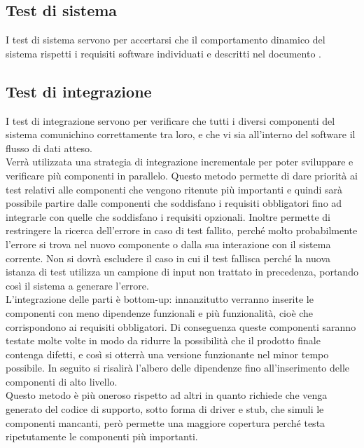 	\subsection{Test di sistema}
	\label{sec:5.4}
		I test di sistema servono per accertarsi che il comportamento dinamico del sistema rispetti i requisiti software individuati e descritti nel documento \ARdoc.
	\subsection{Test di integrazione}
	\label{sec:5.5}
		I test di integrazione servono per verificare che tutti i diversi componenti del sistema comunichino correttamente tra loro, e che vi sia all'interno del software il flusso di dati atteso. \\
		Verrà utilizzata una strategia di integrazione incrementale per poter sviluppare e verificare più componenti in parallelo. Questo metodo permette di dare priorità ai test relativi alle componenti che vengono ritenute più importanti e quindi sarà possibile partire dalle componenti che soddisfano i requisiti obbligatori fino ad integrarle con quelle che soddisfano i requisiti opzionali. Inoltre permette di restringere la ricerca dell'errore in caso di test fallito, perché molto probabilmente l'errore si trova nel nuovo componente o dalla sua interazione con il sistema corrente. Non si dovrà escludere il caso in cui il test fallisca perché la nuova istanza di test utilizza un campione di input non trattato in precedenza, portando così il sistema a generare l'errore. \\
		L'integrazione delle parti è bottom-up: innanzitutto verranno inserite le componenti con meno dipendenze funzionali e più funzionalità, cioè che corrispondono ai requisiti obbligatori. Di conseguenza queste componenti saranno testate molte volte in modo da ridurre la possibilità che il prodotto finale contenga difetti, e così si otterrà una versione funzionante nel minor tempo possibile. In seguito si risalirà l'albero delle dipendenze fino all'inserimento delle componenti di alto livello. \\
		Questo metodo è più oneroso rispetto ad altri in quanto richiede che venga generato del codice di supporto, sotto forma di driver e stub, che simuli le componenti mancanti, però permette una maggiore copertura perché testa ripetutamente le componenti più importanti.